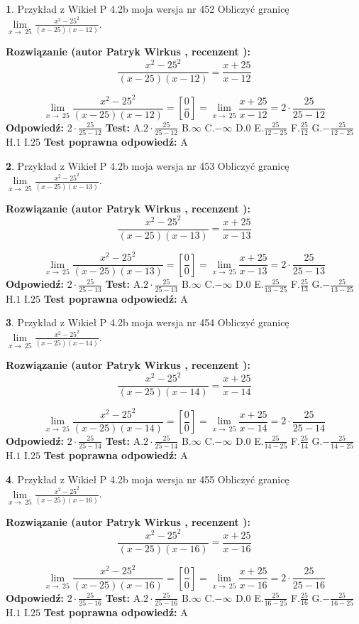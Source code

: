 \documentclass[12pt, a4paper]{article}
\theoremstyle{definition} %
\newtheorem{zad}{}
\newcommand{\zadStart}[1]{\begin{zad}#1\newline}
\newcommand{\zadStop}{\end{zad}}
\newcommand{\rozwStart}[2]{\noindent \textbf{Rozwiązanie (autor #1 , recenzent #2): }\newline}
\newcommand{\rozwStop}{\newline}
\newcommand{\odpStart}{\noindent \textbf{Odpowiedź:}\newline}
\newcommand{\odpStop}{\newline}
\newcommand{\testStart}{\noindent \textbf{Test:}\newline}
\newcommand{\testStop}{\newline}
\newcommand{\kluczStart}{\noindent \textbf{Test poprawna odpowiedź:}\newline}
\newcommand{\kluczStop}{\newline}
\begin{document}
\zadStart{Przykład z Wikieł P 4.2b moja wersja nr 452}
Obliczyć granicę $\lim\limits_{x\to\ 25}\frac{x^{2}-25^{2}}{(x-25)(x-12)}$.
\zadStop
\rozwStart{Patryk Wirkus}{}
$$\frac{x^{2}-25^{2}}{(x-25)(x-12)}=\frac{x+25}{x-12}$$

$$\lim\limits_{x\to\ 25}\frac{x^{2}-25^{2}}{(x-25)(x-12)}=[\frac{0}{0}]=\lim\limits_{x\to\ 25}\frac{x+25}{x-12}=2 \cdot \frac{25}{25-12}$$
\rozwStop
\odpStart
$2 \cdot \frac{25}{25-12}$
\odpStop
\testStart
A.$2 \cdot \frac{25}{25-12}$
B.$\infty$
C.$-\infty$
D.$0$
E.$\frac{25}{12-25}$
F.$\frac{25}{12}$
G.$-\frac{25}{12-25}$
H.$1$
I.$25$
\testStop
\kluczStart
A
\kluczStop



\zadStart{Przykład z Wikieł P 4.2b moja wersja nr 453}
Obliczyć granicę $\lim\limits_{x\to\ 25}\frac{x^{2}-25^{2}}{(x-25)(x-13)}$.
\zadStop
\rozwStart{Patryk Wirkus}{}
$$\frac{x^{2}-25^{2}}{(x-25)(x-13)}=\frac{x+25}{x-13}$$

$$\lim\limits_{x\to\ 25}\frac{x^{2}-25^{2}}{(x-25)(x-13)}=[\frac{0}{0}]=\lim\limits_{x\to\ 25}\frac{x+25}{x-13}=2 \cdot \frac{25}{25-13}$$
\rozwStop
\odpStart
$2 \cdot \frac{25}{25-13}$
\odpStop
\testStart
A.$2 \cdot \frac{25}{25-13}$
B.$\infty$
C.$-\infty$
D.$0$
E.$\frac{25}{13-25}$
F.$\frac{25}{13}$
G.$-\frac{25}{13-25}$
H.$1$
I.$25$
\testStop
\kluczStart
A
\kluczStop



\zadStart{Przykład z Wikieł P 4.2b moja wersja nr 454}
Obliczyć granicę $\lim\limits_{x\to\ 25}\frac{x^{2}-25^{2}}{(x-25)(x-14)}$.
\zadStop
\rozwStart{Patryk Wirkus}{}
$$\frac{x^{2}-25^{2}}{(x-25)(x-14)}=\frac{x+25}{x-14}$$

$$\lim\limits_{x\to\ 25}\frac{x^{2}-25^{2}}{(x-25)(x-14)}=[\frac{0}{0}]=\lim\limits_{x\to\ 25}\frac{x+25}{x-14}=2 \cdot \frac{25}{25-14}$$
\rozwStop
\odpStart
$2 \cdot \frac{25}{25-14}$
\odpStop
\testStart
A.$2 \cdot \frac{25}{25-14}$
B.$\infty$
C.$-\infty$
D.$0$
E.$\frac{25}{14-25}$
F.$\frac{25}{14}$
G.$-\frac{25}{14-25}$
H.$1$
I.$25$
\testStop
\kluczStart
A
\kluczStop



\zadStart{Przykład z Wikieł P 4.2b moja wersja nr 455}
Obliczyć granicę $\lim\limits_{x\to\ 25}\frac{x^{2}-25^{2}}{(x-25)(x-16)}$.
\zadStop
\rozwStart{Patryk Wirkus}{}
$$\frac{x^{2}-25^{2}}{(x-25)(x-16)}=\frac{x+25}{x-16}$$

$$\lim\limits_{x\to\ 25}\frac{x^{2}-25^{2}}{(x-25)(x-16)}=[\frac{0}{0}]=\lim\limits_{x\to\ 25}\frac{x+25}{x-16}=2 \cdot \frac{25}{25-16}$$
\rozwStop
\odpStart
$2 \cdot \frac{25}{25-16}$
\odpStop
\testStart
A.$2 \cdot \frac{25}{25-16}$
B.$\infty$
C.$-\infty$
D.$0$
E.$\frac{25}{16-25}$
F.$\frac{25}{16}$
G.$-\frac{25}{16-25}$
H.$1$
I.$25$
\testStop
\kluczStart
A
\kluczStop
\end{document}
